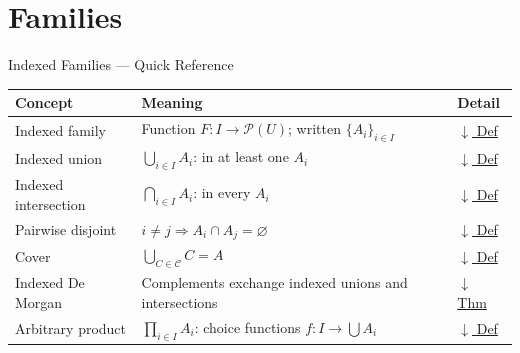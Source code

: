 \section{Families}


\begin{toolkitbox}{Indexed Families --- Quick Reference}
\small
\begin{tabular}{l l l}
\toprule
\textbf{Concept} & \textbf{Meaning} & \textbf{Detail} \\
\midrule
Indexed family      & Function $F : I \to \mathcal{P}(U)$; written $\{A_i\}_{i \in I}$ & \hyperref[def:indexed-family]{$\downarrow$ Def} \\
Indexed union       & $\bigcup_{i \in I} A_i$: in at least one $A_i$                    & \hyperref[def:indexed-union]{$\downarrow$ Def} \\
Indexed intersection & $\bigcap_{i \in I} A_i$: in every $A_i$                         & \hyperref[def:indexed-intersection]{$\downarrow$ Def} \\
Pairwise disjoint   & $i \neq j \Rightarrow A_i \cap A_j = \varnothing$                  & \hyperref[def:pairwise-disjoint]{$\downarrow$ Def} \\
Cover               & $\bigcup_{C \in \mathcal{C}} C = A$                               & \hyperref[def:set-cover]{$\downarrow$ Def} \\
Indexed De Morgan   & Complements exchange indexed unions and intersections             & \hyperref[thm:indexed-de-morgan]{$\downarrow$ Thm} \\
Arbitrary product   & $\prod_{i \in I} A_i$: choice functions $f : I \to \bigcup A_i$   & \hyperref[def:arbitrary-product]{$\downarrow$ Def} \\
\bottomrule
\end{tabular}
\end{toolkitbox}



